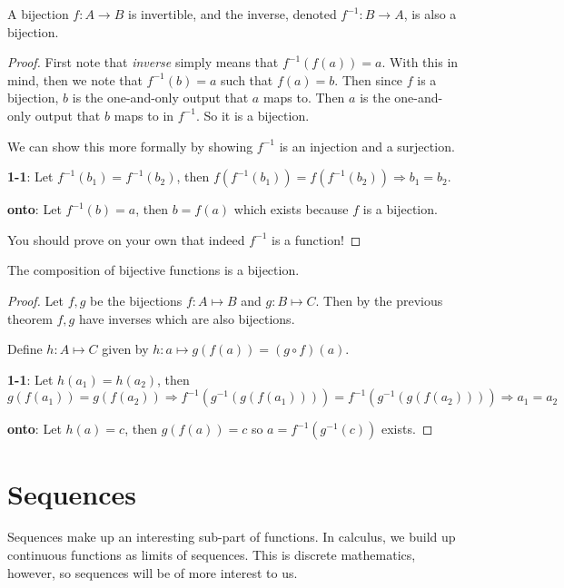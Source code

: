 \documentclass[main.tex]{subfiles}
\begin{document}
\begin{thm}
	A bijection \(f : A \rightarrow B\) is invertible, and the inverse, denoted \(f^{-1} : B \rightarrow A\), is also a bijection.
\end{thm}

\begin{proof}
	First note that \textit{inverse} simply means that \(f^{-1}(f(a)) = a\). With this in mind, then we note that \(f^{-1}(b) = a\) such that \(f(a) = b\). Then since \(f\) is a bijection, \(b\) is the one-and-only output that \(a\) maps to. Then \(a\) is the one-and-only output that \(b\) maps to in \(f^{-1}\). So it is a bijection.
	
	We can show this more formally by showing \(f^{-1}\) is an injection and a surjection.
	
	\textbf{1-1}: Let \(f^{-1}(b_1) = f^{-1}(b_2)\), then \(f(f^{-1}(b_1)) = f(f^{-1}(b_2)) \Rightarrow b_1 = b_2\).
	
	\textbf{onto}: Let \(f^{-1}(b) = a\), then \(b = f(a)\) which exists because \(f\) is a bijection.
	
	You should prove on your own that indeed \(f^{-1}\) is a function!
\end{proof}

\begin{thm}
	The composition of bijective functions is a bijection.
\end{thm}

\begin{proof}
	Let \(f,g\) be the bijections \(f : A \mapsto B\) and \(g : B \mapsto C\). Then by the previous theorem \(f,g\) have inverses which are also bijections.
	
	Define \(h : A \mapsto C\) given by \(h : a \mapsto g(f(a)) = (g \circ f)(a)\).
	
	\textbf{1-1}: Let \(h(a_1) = h(a_2)\), then \(g(f(a_1)) = g(f(a_2)) \Rightarrow f^{-1}(g^{-1}(g(f(a_1)))) = f^{-1}(g^{-1}(g(f(a_2)))) \Rightarrow a_1 = a_2\)
	
	\textbf{onto}: Let \(h(a) = c\), then \(g(f(a)) = c\) so \(a = f^{-1}(g^{-1}(c))\) exists.
\end{proof}

\section{Sequences}

Sequences make up an interesting sub-part of functions. In calculus, we build up continuous functions as limits of sequences. This is discrete mathematics, however, so sequences will be of more interest to us.
\end{document}

